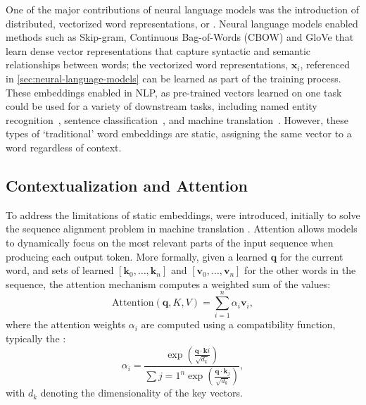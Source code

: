 One of the major contributions of neural language models was the introduction of distributed, vectorized word representations, or . Neural language models enabled methods such as Skip-gram, Continuous Bag-of-Words (CBOW) \citep{mikolov2013efficient, mikolov2013distributed} and GloVe \citep{pennington2014glove} that learn dense vector representations that capture syntactic and semantic relationships between words; the vectorized word representations, $\mathbf{x}_i$, referenced in \ref{sec:neural-language-models} can be learned as part of the training process. These embeddings enabled  in NLP, as pre-trained vectors learned on one task could be used for a variety of downstream tasks, including named entity recognition~\citep{lample2016neural}, sentence classification~\citep{kim2014convolutional}, and machine translation~\citep{qi2018translation}. However, these types of `traditional' word embeddings are static, assigning the same vector to a word regardless of context.


\subsection{Contextualization and Attention}
To address the limitations of static embeddings,  were introduced, initially to solve the sequence alignment problem in machine translation \citep{bahdanau2015neural,luong2015effective}. Attention allows models to dynamically focus on the most relevant parts of the input sequence when producing each output token. More formally, given a learned  $\mathbf{q}$ for the current word, and sets of learned  $[\mathbf{k}_0, \ldots, \mathbf{k}_n]$ and  $[\mathbf{v}_0, \ldots, \mathbf{v}_n]$ for the other words in the sequence, the attention mechanism computes a weighted sum of the values:
\begin{equation}
\text{Attention}(\mathbf{q}, K, V) = \sum_{i=1}^{n} \alpha_i \mathbf{v}_i,
\end{equation}
where the attention weights $\alpha_i$ are computed using a compatibility function, typically the :
\begin{equation}
\alpha_i = \frac{\exp\left(\frac{\mathbf{q} \cdot \mathbf{k}i}{\sqrt{d_k}}\right)}{\sum{j=1}^{n} \exp\left(\frac{\mathbf{q} \cdot \mathbf{k}_j}{\sqrt{d_k}}\right)},
\end{equation}
with $d_k$ denoting the dimensionality of the key vectors. 

